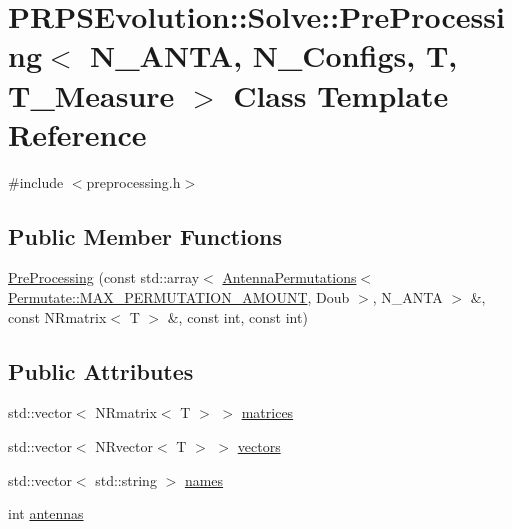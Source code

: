 \hypertarget{class_p_r_p_s_evolution_1_1_solve_1_1_pre_processing}{\section{\-P\-R\-P\-S\-Evolution\-:\-:\-Solve\-:\-:\-Pre\-Processing$<$ \-N\-\_\-\-A\-N\-T\-A, \-N\-\_\-\-Configs, \-T, \-T\-\_\-\-Measure $>$ \-Class \-Template \-Reference}
\label{class_p_r_p_s_evolution_1_1_solve_1_1_pre_processing}
}


{\ttfamily \#include $<$preprocessing.\-h$>$}

\subsection*{\-Public \-Member \-Functions}
\begin{DoxyCompactItemize}
\item 
\hyperlink{class_p_r_p_s_evolution_1_1_solve_1_1_pre_processing_a11e875550d0dba503ad8ff56f4a98b70}{\-Pre\-Processing} (const std\-::array$<$ \hyperlink{struct_p_r_p_s_evolution_1_1_permutate_1_1_antenna_permutations}{\-Antenna\-Permutations}$<$ \hyperlink{namespace_p_r_p_s_evolution_1_1_permutate_a11c56bc21699001cd4ee0afd5d07c7d9}{\-Permutate\-::\-M\-A\-X\-\_\-\-P\-E\-R\-M\-U\-T\-A\-T\-I\-O\-N\-\_\-\-A\-M\-O\-U\-N\-T}, \-Doub $>$, \-N\-\_\-\-A\-N\-T\-A $>$ \&, const \-N\-Rmatrix$<$ \-T $>$ \&, const int, const int)
\end{DoxyCompactItemize}
\subsection*{\-Public \-Attributes}
\begin{DoxyCompactItemize}
\item 
std\-::vector$<$ \-N\-Rmatrix$<$ \-T $>$ $>$ \hyperlink{class_p_r_p_s_evolution_1_1_solve_1_1_pre_processing_a4363f709cf3265ff350176c0e04199cd}{matrices}
\item 
std\-::vector$<$ \-N\-Rvector$<$ \-T $>$ $>$ \hyperlink{class_p_r_p_s_evolution_1_1_solve_1_1_pre_processing_a0bdb461a1530dcba8c79ea249b9ce32a}{vectors}
\item 
std\-::vector$<$ std\-::string $>$ \hyperlink{class_p_r_p_s_evolution_1_1_solve_1_1_pre_processing_afde3fb319d3c383c4384bfd4ef921bdd}{names}
\item 
int \hyperlink{class_p_r_p_s_evolution_1_1_solve_1_1_pre_processing_a010678f523f478eb23ae3b21de3f9bf8}{antennas}
\end{DoxyCompactItemize}
